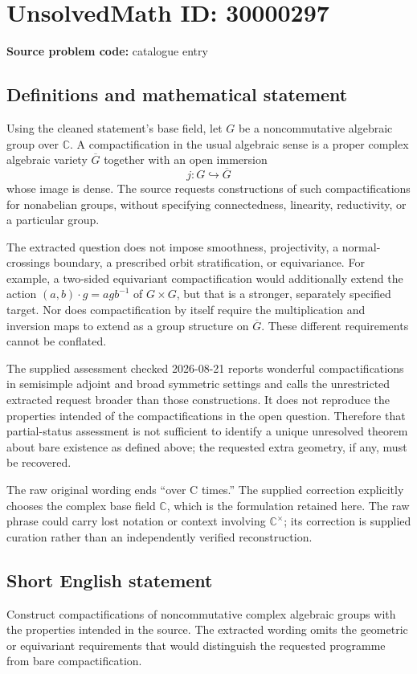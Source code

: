 \documentclass[11pt]{article}
\newcommand{\C}{\mathbb{C}}
\begin{document}
\section*{UnsolvedMath ID: 30000297}
\textbf{Source problem code:} catalogue entry
\subsection{Definitions and mathematical statement}
Using the cleaned statement's base field, let \(G\) be a noncommutative algebraic group over \(\C\). A compactification in the usual algebraic sense is a proper complex algebraic variety \(\overline G\) together with an open immersion
\[
j:G\hookrightarrow\overline G
\]
whose image is dense. The source requests constructions of such compactifications for nonabelian groups, without specifying connectedness, linearity, reductivity, or a particular group.

The extracted question does not impose smoothness, projectivity, a normal-crossings boundary, a prescribed orbit stratification, or equivariance. For example, a two-sided equivariant compactification would additionally extend the action \((a,b)\cdot g=agb^{-1}\) of \(G\times G\), but that is a stronger, separately specified target. Nor does compactification by itself require the multiplication and inversion maps to extend as a group structure on \(\overline G\). These different requirements cannot be conflated.

The supplied assessment checked 2026-08-21 reports wonderful compactifications in semisimple adjoint and broad symmetric settings and calls the unrestricted extracted request broader than those constructions. It does not reproduce the properties intended of the compactifications in the open question. Therefore that partial-status assessment is not sufficient to identify a unique unresolved theorem about bare existence as defined above; the requested extra geometry, if any, must be recovered.

The raw original wording ends ``over C times.'' The supplied correction explicitly chooses the complex base field \(\C\), which is the formulation retained here. The raw phrase could carry lost notation or context involving \(\C^\times\); its correction is supplied curation rather than an independently verified reconstruction.
\subsection{Short English statement}
Construct compactifications of noncommutative complex algebraic groups with the properties intended in the source. The extracted wording omits the geometric or equivariant requirements that would distinguish the requested programme from bare compactification.
\end{document}
